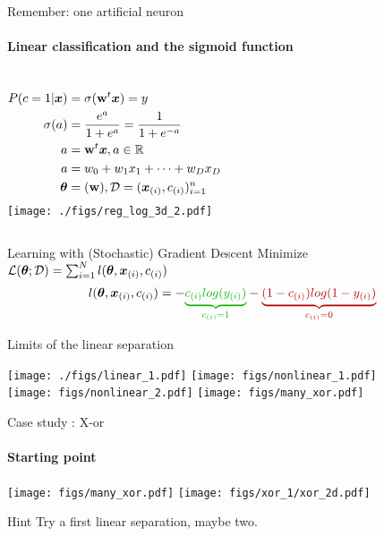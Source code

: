\begin{frame}{Remember: one artificial neuron}
  \framesubtitle{Linear classification and the sigmoid function}
      \begin{columns}
        \begin{align*}
      P({c}=1 | \boldsymbol{x}) &= \sigma(\mathbf{w}^t\boldsymbol{x}) = y \\
      \sigma(a)  &= \frac{e^a}{1+e^a} = \frac{1}{1+e^{-a}}\\
          a&=\mathbf{w}^t\boldsymbol{x}, a \in \mathbb{R}\\
          a &=w_0 +  w_1 x_1 + \cdots + w_{D} x_{D} \\
          \boldsymbol{\theta} &=   (\mathbf{w}),  \mathcal{D} = (\boldsymbol{x}_{(i)}, {c}_{(i)} )_{i=1}^n
        \end{align*}
        \texttt{[image: ./figs/reg\_log\_3d\_2.pdf]}
  \end{columns}

  \begin{block}{Learning with (Stochastic) Gradient Descent }
    Minimize $\mathcal{L}(\boldsymbol{\theta};\mathcal{D}) = \sum_{i=1}^{N} l(\boldsymbol{\theta},\boldsymbol{x}_{(i)},{c}_{(i)})$
    $$ \ploss(\params,\exi,\classi) =  - {\color{green!70!black} \underbrace{\classi log(y_{(i)} )}_{\classi=1}}-
    {\color{red!70!black} \underbrace{(1-\classi) log(1-y_{(i)})}_{\classi=0} }$$
  \end{block}
\end{frame}


\begin{frame}{Limits of the linear separation}
  \begin{center}
\texttt{[image: ./figs/linear\_1.pdf]} 
\texttt{[image: figs/nonlinear\_1.pdf]}\\
\texttt{[image: figs/nonlinear\_2.pdf]}
\texttt{[image: figs/many\_xor.pdf]}
\end{center}
\end{frame}


\begin{frame}{Case study : X-or}
  \framesubtitle{Starting point}
  \texttt{[image: figs/many\_xor.pdf]}
  \texttt{[image: figs/xor\_1/xor\_2d.pdf]}
  \begin{block}{Hint}
    Try a first linear separation, maybe two. 
  \end{block}
\end{frame}


